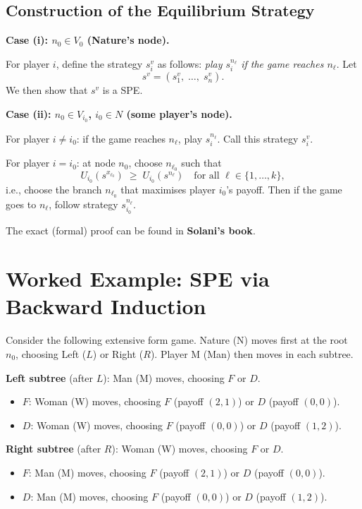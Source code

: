 \documentclass[12pt, a4paper]{article}
\begin{document}
\subsection{Construction of the Equilibrium Strategy}

\textbf{Case (i): $n_0 \in V_0$ (Nature's node).}

For player $i$, define the strategy $s_i^v$ as follows: \emph{play $s_i^{n_\ell}$ if the game reaches $n_\ell$}. Let
\[
  s^v = (s_1^v,\; \ldots,\; s_n^v).
\]
We then show that $s^v$ is a SPE.

\medskip
\textbf{Case (ii): $n_0 \in V_{i_0}$, $i_0 \in N$ (some player's node).}

For player $i \neq i_0$: if the game reaches $n_\ell$, play $s_i^{n_\ell}$. Call this strategy $s_i^v$.

For player $i = i_0$: at node $n_0$, choose $n_{\ell_0}$ such that
\[
  U_{i_0}(s^{x_{\ell_0}}) \;\geq\; U_{i_0}(s^{n_\ell}) \quad \text{for all } \ell \in \{1, \ldots, k\},
\]
i.e., choose the branch $n_{\ell_0}$ that maximises player $i_0$'s payoff. Then if the game goes to $n_\ell$, follow strategy $s_{i_0}^{n_\ell}$.

\begin{notebox}
  The exact (formal) proof can be found in \textbf{Solani's book}.
\end{notebox}

\section{Worked Example: SPE via Backward Induction}

Consider the following extensive form game. Nature (N) moves first at the root $n_0$, choosing Left ($L$) or Right ($R$). Player M (Man) then moves in each subtree.

\medskip
\noindent\textbf{Left subtree} (after $L$): Man (M) moves, choosing $F$ or $D$.
\begin{itemize}
  \item $F$: Woman (W) moves, choosing $F$ (payoff $(2,1)$) or $D$ (payoff $(0,0)$).
  \item $D$: Woman (W) moves, choosing $F$ (payoff $(0,0)$) or $D$ (payoff $(1,2)$).
\end{itemize}

\noindent\textbf{Right subtree} (after $R$): Woman (W) moves, choosing $F$ or $D$.
\begin{itemize}
  \item $F$: Man (M) moves, choosing $F$ (payoff $(2,1)$) or $D$ (payoff $(0,0)$).
  \item $D$: Man (M) moves, choosing $F$ (payoff $(0,0)$) or $D$ (payoff $(1,2)$).
\end{itemize}
\end{document}
